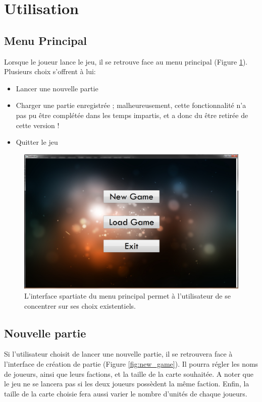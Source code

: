 \section{Utilisation}
\label{section:utilisation}
	\subsection{Menu Principal}
		Lorsque le joueur lance le jeu, il se retrouve face au menu principal (Figure \ref{fig:main_menu}). Plusieurs choix s'offrent à lui:
		\begin{itemize}
			\item Lancer une nouvelle partie
			\item Charger une partie enregistrée ; malheureusement, cette fonctionnalité n'a pas pu être complétée dans les temps impartis, et a donc du être retirée de cette version !
			\item Quitter le jeu
		\end{itemize}

		\begin{figure}[h]
			\centering
			\includegraphics[width=1\textwidth]{figure/main_menu.png}
			\caption{L'interface spartiate du menu principal permet à l'utilisateur de se concentrer sur ses choix existentiels.}
			\label{fig:main_menu}
		\end{figure}


	\subsection{Nouvelle partie}
		Si l'utilisateur choisit de lancer une nouvelle partie, il se retrouvera face à l'interface de création de partie (Figure \ref{fig:new_game}). Il pourra régler les noms de joueurs, ainsi que leurs factions, et la taille de la carte souhaitée. A noter que le jeu ne se lancera pas si les deux joueurs possèdent la même faction. Enfin, la taille de la carte choisie fera aussi varier le nombre d'unités de chaque joueurs.

